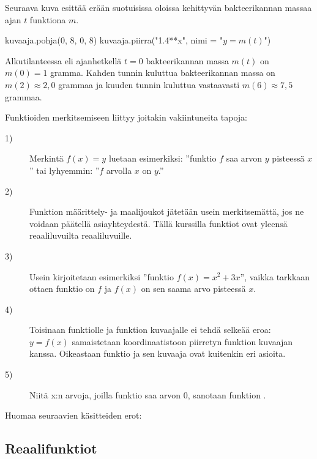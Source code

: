 \begin{esimerkki}
Seuraava kuva esittää erään suotuisissa oloissa kehittyvän bakteerikannan massaa ajan \(t\) funktiona $m$.

\begin{kuva}
    kuvaaja.pohja(0, 8, 0, 8)
    kuvaaja.piirra("1.4**x", nimi = "$y=m(t)$")
\end{kuva}

Alkutilanteessa eli ajanhetkellä \(t=0\) bakteerikannan massa \(m(t)\) on \(m(0)=1\) gramma. Kahden tunnin kuluttua bakteerikannan massa on \(m(2)\approx 2,0\) grammaa ja kuuden tunnin kuluttua vastaavasti \(m(6)\approx 7,5\) grammaa. 
\end{esimerkki}

Funktioiden merkitsemiseen liittyy joitakin vakiintuneita tapoja:
\begin{description}
	\item[1)] Merkintä $f(x) = y$ luetaan esimerkiksi: ''funktio \(f\) saa arvon $y$ pisteessä $x$'' tai lyhyemmin: ''\(f\) arvolla \(x\) on \(y\).''
	\item[2)] Funktion määrittely- ja maalijoukot jätetään usein merkitsemättä, jos ne voidaan päätellä asiayhteydestä.
		Tällä kurssilla funktiot ovat yleensä reaaliluvuilta reaaliluvuille.
	\item[3)] Usein kirjoitetaan esimerkiksi ''funktio $f(x) = x^2+3x$'', vaikka tarkkaan ottaen funktio on $f$ ja
		$f(x)$ on sen saama arvo pisteessä $x$.
	\item[4)] Toisinaan funktiolle ja funktion kuvaajalle ei tehdä selkeää eroa:
		$y = f(x)$ samaistetaan koordinaatistoon piirretyn funktion kuvaajan kanssa.
		Oikeastaan funktio ja sen kuvaaja ovat kuitenkin eri asioita.
	\item[5)] Niitä x:n arvoja, joilla funktio saa arvon 0, sanotaan funktion .
\end{description}

Huomaa seuraavien käsitteiden erot:

\subsection*{Reaalifunktiot}

